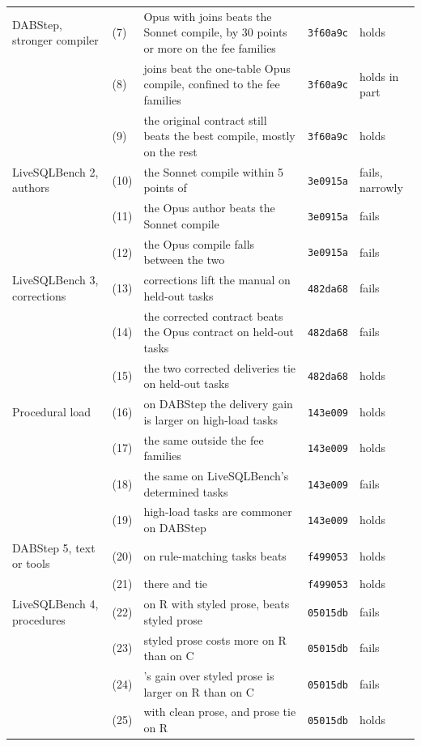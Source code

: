 \begin{table}[t]
\begin{tabular}{@{}L{2.7cm}L{1.5cm}L{9.0cm}ll@{}}
\midrule
DABStep, stronger compiler & (7) & Opus with joins beats the Sonnet compile, by 30 points or more on the fee families & \texttt{3f60a9c} & holds \\
 & (8) & joins beat the one-table Opus compile, confined to the fee families & \texttt{3f60a9c} & holds in part \\
 & (9) & the original contract still beats the best compile, mostly on the rest & \texttt{3f60a9c} & holds \\
\midrule
LiveSQLBench 2, authors & (10) & the Sonnet compile within 5 points of \armM{} & \texttt{3e0915a} & fails, narrowly \\
 & (11) & the Opus author beats the Sonnet compile & \texttt{3e0915a} & fails \\
 & (12) & the Opus compile falls between the two & \texttt{3e0915a} & fails \\
\midrule
LiveSQLBench 3, corrections & (13) & corrections lift the manual on held-out tasks & \texttt{482da68} & fails \\
 & (14) & the corrected contract beats the Opus contract on held-out tasks & \texttt{482da68} & fails \\
 & (15) & the two corrected deliveries tie on held-out tasks & \texttt{482da68} & holds \\
\midrule
Procedural load & (16) & on DABStep the delivery gain is larger on high-load tasks & \texttt{143e009} & holds \\
 & (17) & the same outside the fee families & \texttt{143e009} & holds \\
 & (18) & the same on LiveSQLBench's determined tasks & \texttt{143e009} & fails \\
 & (19) & high-load tasks are commoner on DABStep & \texttt{143e009} & holds \\
\midrule
DABStep 5, text or tools & (20) & on rule-matching tasks \armT{} beats \armMw{} & \texttt{f499053} & holds \\
 & (21) & there \armC{} and \armT{} tie & \texttt{f499053} & holds \\
LiveSQLBench 4, procedures & (22) & on R with styled prose, \armC{} beats styled prose & \texttt{05015db} & fails \\
 & (23) & styled prose costs more on R than on C & \texttt{05015db} & fails \\
 & (24) & \armC{}'s gain over styled prose is larger on R than on C & \texttt{05015db} & fails \\
 & (25) & with clean prose, \armC{} and prose tie on R & \texttt{05015db} & holds \\

\end{tabular}
\end{table}
